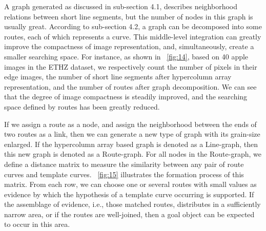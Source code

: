 \documentclass[journal]{IEEEtran}
\begin{document}
A graph generated as discussed in sub-section 4.1, 
describes neighborhood relations between short line segments, 
but the number of nodes in this graph is usually great. 
According to sub-section 4.2, a graph can be decomposed into some routes, each of which represents a curve. 
This middle-level integration can greatly improve the compactness of image representation, 
and, simultaneously, create a smaller searching space. 
For instance, as shown in \figurename~\ref{fig:14}, based on 40 apple images in the ETHZ dataset, 
we respectively count the number of pixels in their edge images, the number of short line segments after hypercolumn array representation, and the number of routes after graph decomposition. 
We can see that the degree of image compactness is steadily improved, and the searching space defined by routes has been greatly reduced.

If we assign a route as a node, and assign the neighborhood between the ends of two routes as a link, 
then we can generate a new type of graph with its grain-size enlarged. 
If the hypercolumn array based graph is denoted as a Line-graph, then this new graph is denoted as a Route-graph. 
For all nodes in the Route-graph, we define a distance matrix to measure the similarity between any pair of route curves and template curves. 
\figurename~\ref{fig:15} illustrates the formation process of this matrix. 
From each row, we can choose one or several routes with small values as evidence by which the hypothesis of a template curve occurring is supported. 
If the assemblage of evidence, i.e., those matched routes, distributes in a sufficiently narrow area, 
or if the routes are well-joined, then a goal object can be expected to occur in this area.
\end{document}
